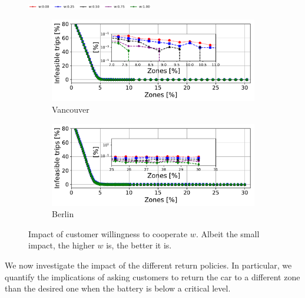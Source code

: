 \begin{figure}[t!]
  \begin{center}
	 \includegraphics[width=0.49\textwidth]{figures/legenda.pdf}
  \vspace{-1cm}
  \end{center}
    \begin{center}
         \begin{subfigure}{0.49\textwidth}
             \includegraphics[width=\columnwidth]{figures/cut_Vancouver_DeathsVsZones_Policy_44_tt-25_100_4.pdf}
             \caption{Vancouver}
             \label{fig:zone_vs_deaths_vancouver_willingness}
         \end{subfigure}         
         \begin{subfigure}{0.49\textwidth}
             \includegraphics[width=\columnwidth]{figures/cut_Berlino_DeathsVsZones_Policy_44_tt-25_100_4.pdf}
             \caption{Berlin}
             \label{fig:zone_vs_deaths_berlino_willingness}
         \end{subfigure}
         \caption{Impact of customer willingness to cooperate $w$. Albeit the small impact, the higher $w$ is, the better it is.}
         \label{fig:zone_vs_deaths_willingness}
\end{center}
\end{figure}
We now investigate the impact of the different return policies. In particular, we quantify the implications of asking customers to return the car to a different zone than the desired one when the battery is below a critical level.

